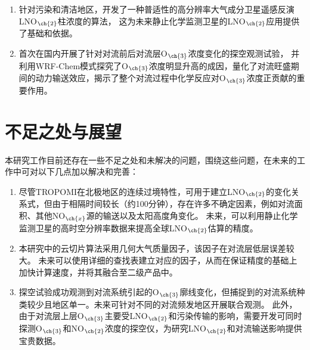 \begin{enumerate}[label=（\arabic*）, labelindent=\parindent, nosep, leftmargin=0pt, widest=0, itemindent=*, topsep=0pt, partopsep=0pt, parsep=0pt]

\item 针对污染和清洁地区，开发了一种普适性的高分辨率大气成分卫星遥感反演LNO$_{\ch{2}}$柱浓度的算法，
这为未来静止化学监测卫星的LNO$_{\ch{2}}$应用提供了基础和依据。

\item 首次在国内开展了针对对流前后对流层O$_{\ch{3}}$浓度变化的探空观测试验，
并利用WRF-Chem模式探究了O$_{\ch{3}}$浓度明显升高的成因，量化了对流旺盛期间的动力输送效应，揭示了整个对流过程中化学反应对O$_{\ch{3}}$浓度正贡献的重要作用。

\end{enumerate}


\section{不足之处与展望}

本研究工作目前还存在一些不足之处和未解决的问题，围绕这些问题，在未来的工作中可对以下几点加以解决和完善：

\begin{enumerate}[label=（\arabic*）, labelindent=\parindent, nosep, leftmargin=0pt, widest=0, itemindent=*, topsep=0pt, partopsep=0pt, parsep=0pt]

\item 尽管TROPOMI在北极地区的连续过境特性，可用于建立LNO$_{\ch{2}}$的变化关系式，但由于相隔时间较长（约100分钟），存在许多不确定因素，例如对流面积、其他NO$_{\ch{x}}$源的输送以及太阳高度角变化。
未来，可以利用静止化学监测卫星的高时空分辨率数据来提高全球LNO$_{\ch{2}}$估算的精度。

\item 本研究中的云切片算法采用几何大气质量因子，该因子在对流层低层误差较大。
未来可以使用详细的查找表建立对应的因子，从而在保证精度的基础上加快计算速度，并将其融合至二级产品中。

\item 探空试验成功观测到对流系统引起的O$_{\ch{3}}$廓线变化，但捕捉到的对流系统种类较少且地区单一。未来可针对不同的对流频发地区开展联合观测。
此外，由于对流层上层O$_{\ch{3}}$主要受LNO$_{\ch{2}}$和污染传输的影响，需要开发可同时探测O$_{\ch{3}}$和NO$_{\ch{2}}$浓度的探空仪，为研究LNO$_{\ch{2}}$和对流输送影响提供宝贵数据。

\end{enumerate}
